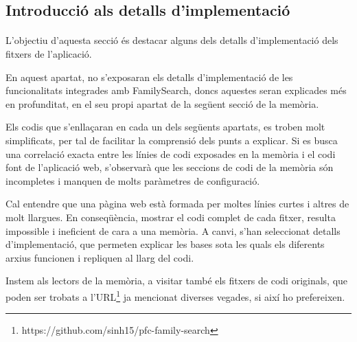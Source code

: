\subsection{Introducció als detalls d'implementació}

    \paragraph{}
    L'objectiu d'aquesta secció és destacar alguns dels detalls d'implementació dels fitxers de l'aplicació.

    En aquest apartat, no s'exposaran els detalls d'implementació de les funcionalitats integrades amb FamilySearch, doncs aquestes seran explicades més en profunditat, en el seu propi apartat de la següent secció de la memòria.

    Els codis que s'enllaçaran en cada un dels següents apartats, es troben molt simplificats, per tal de facilitar la comprensió dels punts a explicar. Si es busca una correlació exacta entre les línies de codi exposades en la memòria i el codi font de l'aplicació web, s'observarà que les seccions de codi de la memòria són incompletes i manquen de molts paràmetres de configuració.

    Cal entendre que una pàgina web està formada per moltes línies curtes i altres de molt llargues. En conseqüència, mostrar el codi complet de cada fitxer, resulta impossible i ineficient de cara a una memòria. A canvi, s'han seleccionat detalls d'implementació, que permeten explicar les bases sota les quals els diferents arxius funcionen i repliquen al llarg del codi.

    Instem als lectors de la memòria, a visitar també els fitxers de codi originals, que poden ser trobats a l'URL\footnote{https://github.com/sinh15/pfc-family-search} ja mencionat diverses vegades, si així ho prefereixen.
